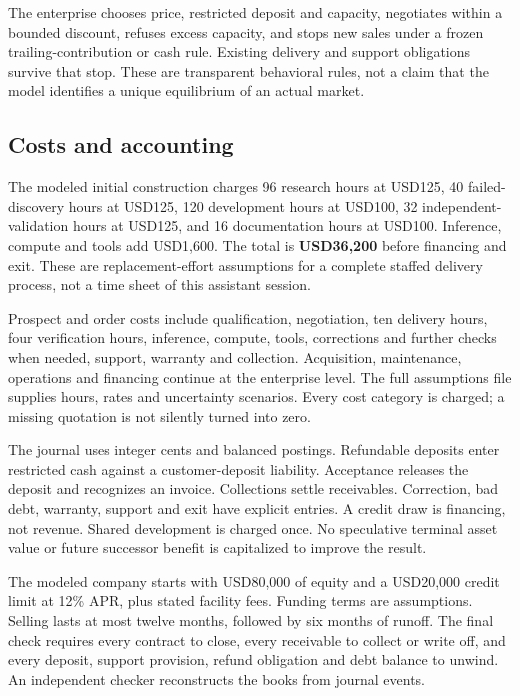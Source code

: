 \documentclass[
  11pt,
]{article}
\begin{document}
The enterprise chooses price, restricted deposit and capacity,
negotiates within a bounded discount, refuses excess capacity, and stops
new sales under a frozen trailing-contribution or cash rule. Existing
delivery and support obligations survive that stop. These are
transparent behavioral rules, not a claim that the model identifies a
unique equilibrium of an actual market.

\hypertarget{costs-and-accounting}{%
\subsection{Costs and accounting}\label{costs-and-accounting}}

The modeled initial construction charges 96 research hours at USD125, 40
failed-discovery hours at USD125, 120 development hours at USD100, 32
independent-validation hours at USD125, and 16 documentation hours at
USD100. Inference, compute and tools add USD1,600. The total is
\textbf{USD36,200} before financing and exit. These are
replacement-effort assumptions for a complete staffed delivery process,
not a time sheet of this assistant session.

Prospect and order costs include qualification, negotiation, ten
delivery hours, four verification hours, inference, compute, tools,
corrections and further checks when needed, support, warranty and
collection. Acquisition, maintenance, operations and financing continue
at the enterprise level. The full assumptions file supplies hours, rates
and uncertainty scenarios. Every cost category is charged; a missing
quotation is not silently turned into zero.

The journal uses integer cents and balanced postings. Refundable
deposits enter restricted cash against a customer-deposit liability.
Acceptance releases the deposit and recognizes an invoice. Collections
settle receivables. Correction, bad debt, warranty, support and exit
have explicit entries. A credit draw is financing, not revenue. Shared
development is charged once. No speculative terminal asset value or
future successor benefit is capitalized to improve the result.

The modeled company starts with USD80,000 of equity and a USD20,000
credit limit at 12\% APR, plus stated facility fees. Funding terms are
assumptions. Selling lasts at most twelve months, followed by six months
of runoff. The final check requires every contract to close, every
receivable to collect or write off, and every deposit, support
provision, refund obligation and debt balance to unwind. An independent
checker reconstructs the books from journal events.
\end{document}
